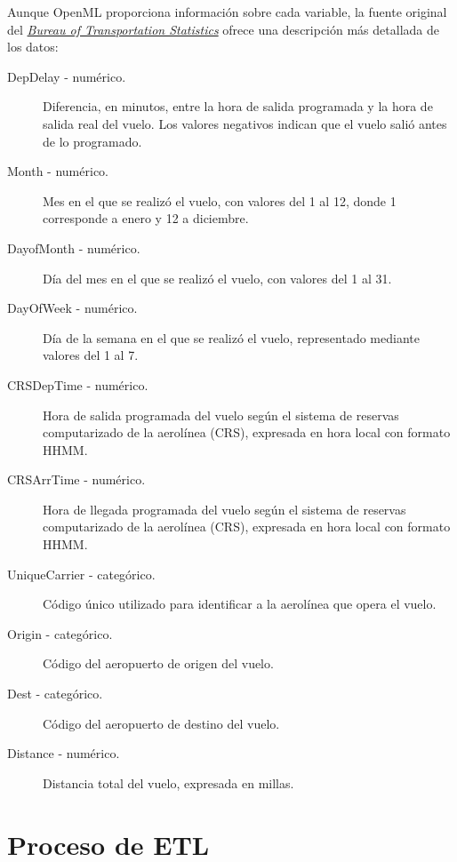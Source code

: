 \documentclass[a4paper,12pt,twocolumn]{report}
\begin{document}
Aunque OpenML proporciona información sobre cada variable, la fuente original del \textit{\href{https://www.transtats.bts.gov/DL_SelectFields.aspx?gnoyr_VQ=FGJ&QO_fu146_anzr=b0-gvzr}{Bureau of Transportation Statistics}} ofrece una descripción más detallada de los datos:
\begin{description}
    \item[DepDelay - numérico.] Diferencia, en minutos, entre la hora de salida programada y la hora de salida real del vuelo. Los valores negativos indican que el vuelo salió antes de lo programado.
    \item[Month - numérico.] Mes en el que se realizó el vuelo, con valores del 1 al 12, donde 1 corresponde a enero y 12 a diciembre.
    \item[DayofMonth - numérico.] Día del mes en el que se realizó el vuelo, con valores del 1 al 31.
    \item[DayOfWeek - numérico.] Día de la semana en el que se realizó el vuelo, representado mediante valores del 1 al 7.
    \item[CRSDepTime - numérico.] Hora de salida programada del vuelo según el sistema de reservas computarizado de la aerolínea (CRS), expresada en hora local con formato HHMM.
    \item[CRSArrTime - numérico.] Hora de llegada programada del vuelo según el sistema de reservas computarizado de la aerolínea (CRS), expresada en hora local con formato HHMM.
    \item[UniqueCarrier - categórico.] Código único utilizado para identificar a la aerolínea que opera el vuelo.
    \item[Origin - categórico.] Código del aeropuerto de origen del vuelo.
    \item[Dest - categórico.] Código del aeropuerto de destino del vuelo.
    \item[Distance - numérico.] Distancia total del vuelo, expresada en millas.
\end{description}

\section{Proceso de ETL}
\end{document}
